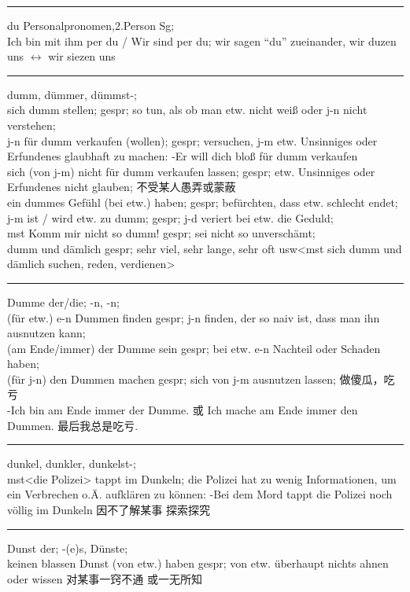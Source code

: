 \noindent\rule{\textwidth}{1pt}
du Personalpronomen,2.Person Sg; \\
Ich bin mit ihm per du / Wir sind per du; wir sagen ``du'' zueinander, wir duzen uns $\leftrightarrow$ wir siezen uns \\

\noindent\rule{\textwidth}{1pt}
dumm, d\"ummer, d\"ummst-; \\
sich dumm stellen; gespr; so tun, als ob man etw. nicht wei\ss{} oder j-n nicht verstehen; \\
j-n f\"ur dumm verkaufen (wollen); gespr; versuchen, j-m etw. Unsinniges oder Erfundenes glaubhaft zu machen: -Er will dich blo\ss{} f\"ur dumm verkaufen\\
sich (von j-m) nicht f\"ur dumm verkaufen lassen; gespr; etw. Unsinniges oder Erfundenes nicht glauben; 不受某人愚弄或蒙蔽\\
ein dummes Gef\"uhl (bei etw.) haben; gespr; bef\"urchten, dass etw. schlecht endet; \\
j-m ist / wird etw. zu dumm; gespr; j-d veriert bei etw. die Geduld; \\
mst Komm mir nicht so dumm! gespr; sei nicht so unversch\"amt; \\
dumm und d\"amlich gespr; sehr viel, sehr lange, sehr oft usw<mst sich dumm und d\"amlich suchen, reden, verdienen> \\

\noindent\rule{\textwidth}{1pt}
Dumme der/die; -n, -n;\\
(f\"ur etw.) e-n Dummen finden gespr; j-n finden, der so naiv ist, dass man ihn ausnutzen kann; \\
(am Ende/immer) der Dumme sein gespr; bei etw. e-n Nachteil oder Schaden haben; \\
(f\"ur j-n) den Dummen machen gespr; sich von j-m ausnutzen lassen; 做傻瓜，吃亏\\
-Ich bin am Ende immer der Dumme. 或 Ich mache am Ende immer den Dummen. 最后我总是吃亏.\\

\noindent\rule{\textwidth}{1pt}
dunkel, dunkler, dunkelst-; \\
mst<die Polizei> tappt im Dunkeln; die Polizei hat zu wenig Informationen, um ein Verbrechen o.\"A. aufkl\"aren zu k\"onnen: -Bei dem Mord tappt die Polizei noch v\"ollig im Dunkeln 因不了解某事 探索探究\\

\noindent\rule{\textwidth}{1pt}
Dunst der; -(e)s, D\"unste; \\
keinen blassen Dunst (von etw.) haben gespr; von etw. \"uberhaupt nichts ahnen oder wissen 对某事一窍不通 或一无所知\\

